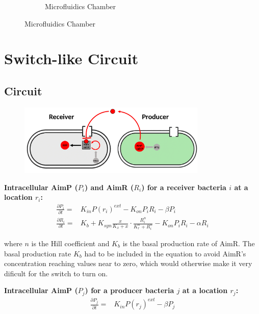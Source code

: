 \documentclass[11pt,a4paper]{article}
\begin{document}
\begin{figure}[H]
\begin{subfigure}[b]{0.45\textwidth}
        \caption{Microfluidics Chamber}
        \label{fig:mono_dec_real}
    \end{subfigure}
    \label{fig:mono_dec_comparison}
\end{figure}

\section{Switch-like Circuit}

\subsection{Circuit}

\begin{figure}[H]
    \centering
    \includegraphics[width=0.8\textwidth]{../figures/SwitchLikeDiag.png}
    \label{fig:mono_dec_schematic}
\end{figure}

\textbf{Intracellular AimP ($P_i$) and AimR ($R_i$) for a receiver bacteria $i$ at a location $r_i$:}
\begin{align*}
\frac{\partial P_i}{\partial t} =& K_{in} P(r_i)^{ext} - K_{on} P_i R_i - \beta P_i\\
\frac{\partial R_i}{\partial t} =& K_b + K_{syn} \frac{x}{K_x + x} \cdot \frac{R_i^n}{K_r^n + R_i^n} - K_{on} P_i R_i - \alpha R_i 
\end{align*}

where $n$ is the Hill coefficient and $K_b$ is the basal production rate of AimR. The basal production rate $K_b$ had to be included in the equation to avoid AimR's concentration reaching values near to zero, which would 
otherwise make it very dificult for the switch to turn on.

\textbf{Intracellular AimP ($P_j$) for a producer bacteria $j$ at a location $r_j$:}
\begin{align*}
\frac{\partial P_j}{\partial t} =& K_{in} P(r_j)^{ext} - \beta P_j\\
\end{align*}
\end{document}
